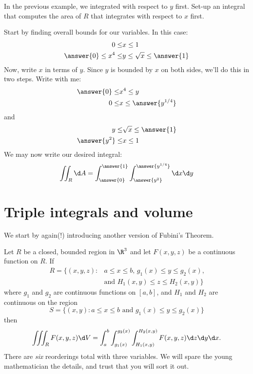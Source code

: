 \documentclass{ximera}
\begin{document}
\begin{question}
  In the previous example, we integrated with respect to $y$
  first. Set-up an integral that computes the area of $R$ that
  integrates with respect to $x$ first.
  \begin{prompt}
    Start by finding overall bounds for our variables. In this case:
    \begin{align*}
      0\le &x \le 1\\
      \answer{0}\le x^4\le &y \le \sqrt{x}\le \answer{1}
    \end{align*}
    Now, write $x$ in terms of $y$. Since $y$ is bounded by $x$ on
    both sides, we'll do this in two steps. Write with me:
    \begin{align*}
      \answer{0}\le &x^4\le y\\
      0 \le &x \le \answer{y^{1/4}}
    \end{align*}
    and
    \begin{align*}
      y\le &\sqrt{x}\le \answer{1}\\
      \answer{y^2} \le &x \le 1
    \end{align*}
    We may now write our desired integral:
    \[
    \iint_R \d A = \int_{\answer{0}}^{\answer{1}}\int_{\answer{y^2}}^{\answer{y^{1/4}}} \d x \d y
    \]
  \end{prompt}
\end{question}


\section{Triple integrals and volume}

We start by again(!) introducing another version of Fubini's Theorem.

\begin{theorem}[Fubini]
  Let $R$ be a closed, bounded region in $\R^3$ and let $F(x,y,z)$ be
  a continuous function on $R$. If
    \begin{align*}
      R=\{(x,y,z):&\text{$a\leq x\leq b$, $g_1(x)\leq y\leq g_2(x)$,}\\
        &\text{and $H_1(x,y) \leq z \leq H_2(x,y)$}\}
    \end{align*}
    where $g_1$ and $g_2$ are continuous functions on $[a,b]$, and $H_1$ and $H_2$ are continuous on the region
    \[
    S =\{(x,y):\text{$a\leq x\leq b$ and $g_1(x)\leq y\leq g_2(x)$}\}
    \]
    then
    \[
    \iiint_R F(x,y,z) \d V = \int_a^b\int_{g_1(x)}^{g_2(x)}\int_{H_1(x,y)}^{H_2(x,y)} F(x,y,z)\d z\d y\d x.
    \]
    There are \textit{six} reorderings total with three variables. We will spare
    the young mathematician the details, and trust that you will sort
    it out.
\end{theorem}
\end{document}
